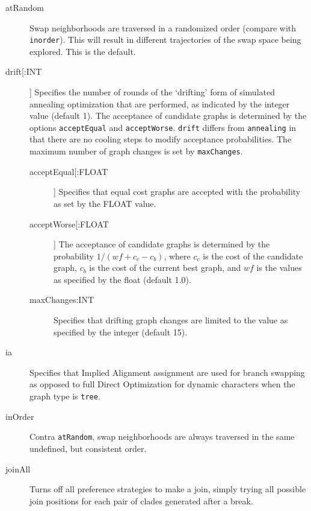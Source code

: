\begin{description}
\begin{description}
		\end{description}
		
		\item[atRandom] Swap neighborhoods are traversed in a randomized order (compare 
		with \texttt{inorder}). 	This will result in different trajectories of the swap space being 
		explored. This is the default.
		
		\item[drift[:INT]] Specifies the number of rounds of the `drifting' form of simulated 
		annealing \citep{goloboff1999} optimization that are performed, as indicated by the integer 
		value (default 1). The acceptance of candidate graphs is determined by the options 
		\texttt{acceptEqual} and \texttt{acceptWorse}. \texttt{drift} differs from \texttt{annealing} 
		in that there are no cooling steps to modify acceptance probabilities. The maximum 
		number of graph changes is set by \texttt{maxChanges}.
			
		\begin{description}
			
			\item[acceptEqual[:FLOAT]] Specifies that equal cost graphs are accepted with the
			probability as set by the FLOAT value. 
			
			\item[acceptWorse[:FLOAT]] The acceptance of candidate graphs is determined by the 
			probability $1/ (wf + c_c - c_b)$, where $c_c$ is the cost of the candidate graph, $c_b$ 
			is the cost of the current best graph, and $wf$ is the values as specified by the float 
			(default 1.0). 	
			
			\item[maxChanges:INT] Specifies that drifting graph changes are limited to the 
			value as specified by the integer (default 15).
			
		\end{description}
		
		\item[ia] Specifies that Implied Alignment \citep{Wheeler2003} assignment are used for 
		branch swapping as opposed to full Direct Optimization for dynamic characters when the 
		graph type is \texttt{tree}.
		
		\item[inOrder] Contra \texttt{atRandom}, swap neighborhoods are always traversed 
		in the same undefined, but consistent order.
		
		\item[joinAll] Turns off all preference strategies to make a join, simply trying all possible 
		join positions for each pair of clades generated after a break. 


\end{description}
